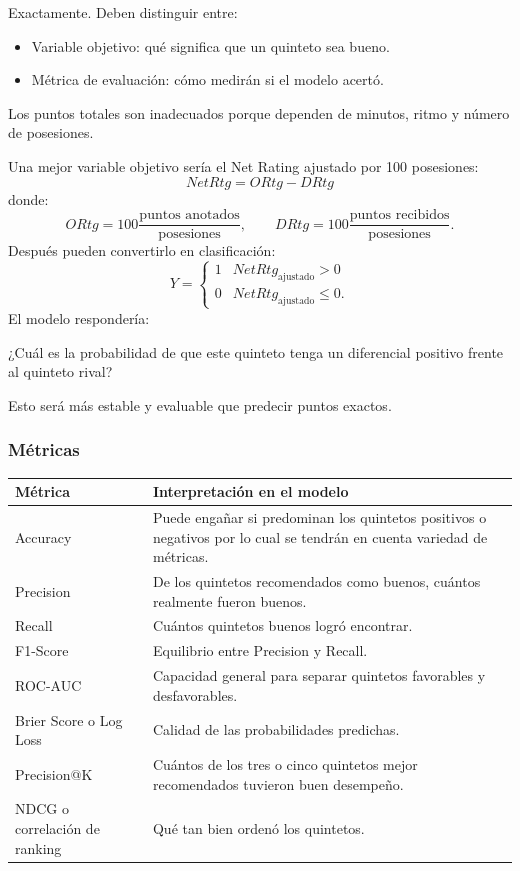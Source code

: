 Exactamente. Deben distinguir entre:
\begin{itemize}
\item Variable objetivo: qué significa que un quinteto sea bueno.
\item Métrica de evaluación: cómo medirán si el modelo acertó.
\end{itemize}
Los puntos totales son inadecuados porque dependen de minutos, ritmo y número de posesiones.

Una mejor variable objetivo sería el Net Rating ajustado por 100 posesiones:
\[
NetRtg=ORtg-DRtg
\]
donde:
\[
ORtg=100\frac{\text{puntos anotados}}{\text{posesiones}},
\qquad DRtg=100\frac{\text{puntos recibidos}}{\text{posesiones}}.
\]
Después pueden convertirlo en clasificación:
\[
Y=\begin{cases}
1&NetRtg_{\mathrm{ajustado}}>0\\
0&NetRtg_{\mathrm{ajustado}}\leq0.
\end{cases}
\]
El modelo respondería:

¿Cuál es la probabilidad de que este quinteto tenga un diferencial positivo frente al quinteto rival?

Esto será más estable y evaluable que predecir puntos exactos.

\subsubsection*{Métricas}
\begin{longtable}{@{}p{3.3cm}p{9.4cm}@{}}
\toprule\textbf{Métrica}&\textbf{Interpretación en el modelo}\\\midrule\endhead
Accuracy&Puede engañar si predominan los quintetos positivos o negativos por lo cual se tendrán en cuenta variedad de métricas.\\
Precision&De los quintetos recomendados como buenos, cuántos realmente fueron buenos.\\
Recall&Cuántos quintetos buenos logró encontrar.\\
F1-Score&Equilibrio entre Precision y Recall.\\
ROC-AUC&Capacidad general para separar quintetos favorables y desfavorables.\\
Brier Score o Log Loss&Calidad de las probabilidades predichas.\\
Precision@K&Cuántos de los tres o cinco quintetos mejor recomendados tuvieron buen desempeño.\\
NDCG o correlación de ranking&Qué tan bien ordenó los quintetos.\\
\bottomrule
\end{longtable}

